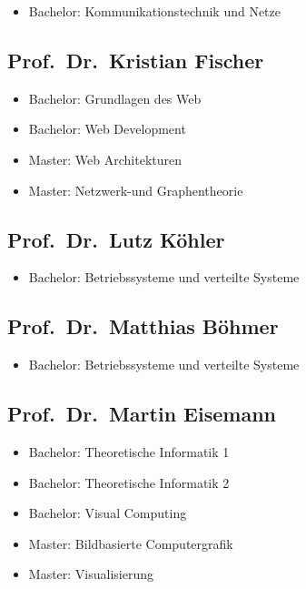 \begin{itemize}
\tightlist
\item
  Bachelor: Kommunikationstechnik und Netze
\end{itemize}

\subsection{Prof.~Dr.~Kristian
Fischer}\label{prof.dr.kristian-fischer}

\begin{itemize}
\tightlist
\item
  Bachelor: Grundlagen des Web
\item
  Bachelor: Web Development
\item
  Master: Web Architekturen
\item
  Master: Netzwerk-und Graphentheorie
\end{itemize}

\subsection{Prof.~Dr.~Lutz Köhler}\label{prof.dr.lutz-kuxf6hler}

\begin{itemize}
\tightlist
\item
  Bachelor: Betriebssysteme und verteilte Systeme
\end{itemize}

\subsection{Prof.~Dr.~Matthias
Böhmer}\label{prof.dr.matthias-buxf6hmer}

\begin{itemize}
\tightlist
\item
  Bachelor: Betriebssysteme und verteilte Systeme
\end{itemize}

\subsection{Prof.~Dr.~Martin Eisemann}\label{prof.dr.martin-eisemann}

\begin{itemize}
\tightlist
\item
  Bachelor: Theoretische Informatik 1
\item
  Bachelor: Theoretische Informatik 2
\item
  Bachelor: Visual Computing
\item
  Master: Bildbasierte Computergrafik
\item
  Master: Visualisierung
\end{itemize}

